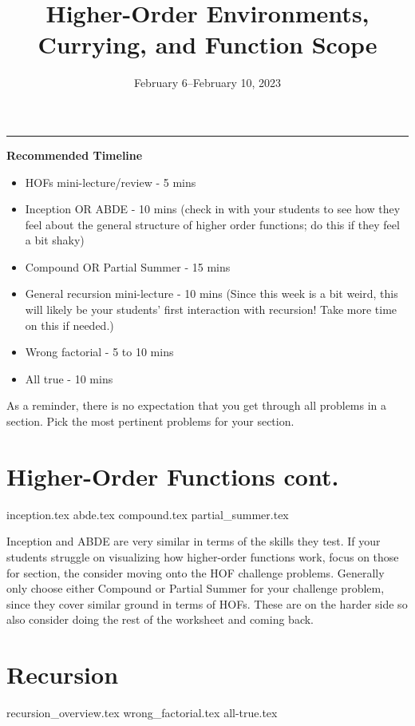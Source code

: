 \documentclass{exam}
\title{Higher-Order Environments, Currying, and Function Scope}
\date{February 6--February 10, 2023}
\begin{document}
\maketitle
\rule{\textwidth}{0.15em}
\fontsize{12}{15}\selectfont

\begin{meta}
\textbf{Recommended Timeline}
\begin{itemize}
    \item HOFs mini-lecture/review - 5 mins
    \item Inception OR ABDE - 10 mins (check in with your students to see how they feel about the general structure of higher order functions; do this if they feel a bit shaky)
    \item Compound OR Partial Summer - 15 mins
    \item General recursion mini-lecture - 10 mins (Since this week is a bit weird, this will likely be your students' first interaction with recursion! Take more time on this if needed.)
    \item Wrong factorial - 5 to 10 mins
    \item All true - 10 mins
\end{itemize}
As a reminder, there is no expectation that you get through all problems in a section. Pick the most pertinent problems for your section. 
\end{meta}

\begin{questions}
    \section{Higher-Order Functions cont.}
    {inception.tex}
    {abde.tex}
    {compound.tex}
    {partial_summer.tex}
    \begin{questionmeta}
        Inception and ABDE are very similar in terms of the skills they test. If your students struggle on visualizing how higher-order functions work, focus on those for section, the consider moving onto the HOF challenge problems.
        Generally only choose either Compound or Partial Summer for your challenge problem, since they cover similar ground in terms of HOFs. These are on the harder side so also consider doing the rest of the worksheet and coming back.
    \end{questionmeta}

    \section{Recursion}
    {recursion_overview.tex}
    {wrong_factorial.tex}
    {all-true.tex}
\end{questions}
\end{document}

